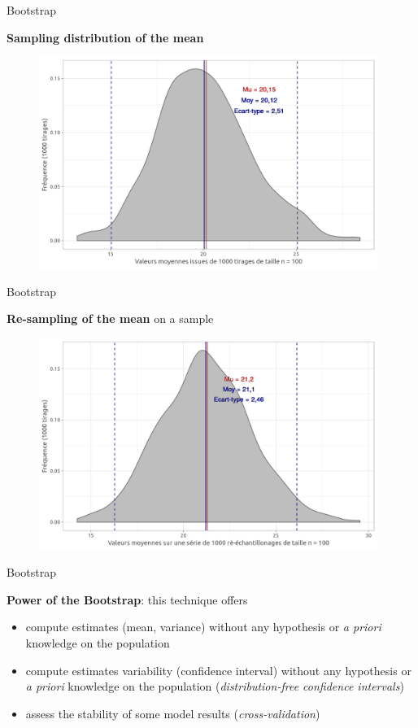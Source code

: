\begin{frame}{Bootstrap}

\textbf{Sampling distribution of the mean}

\begin{figure}
\includegraphics[width=11cm]{SampDist.png}
\end{figure}

\end{frame}


\begin{frame}{Bootstrap}

\textbf{Re-sampling of the mean} on a sample 

\begin{figure}
\includegraphics[width=11cm]{SampDistBoot.png}
\end{figure}

\end{frame}


\begin{frame}{Bootstrap}


\textbf{Power of the Bootstrap}: this technique offers

\begin{itemize}
\item compute estimates (mean, variance) without any hypothesis or \textit{a priori} knowledge on the population
\item compute estimates variability  (confidence interval) without any hypothesis or \textit{a priori} knowledge on the population (\textit{distribution-free confidence intervals})
\item assess the stability of some model results  (\textit{cross-validation})
\end{itemize}

\end{frame}



